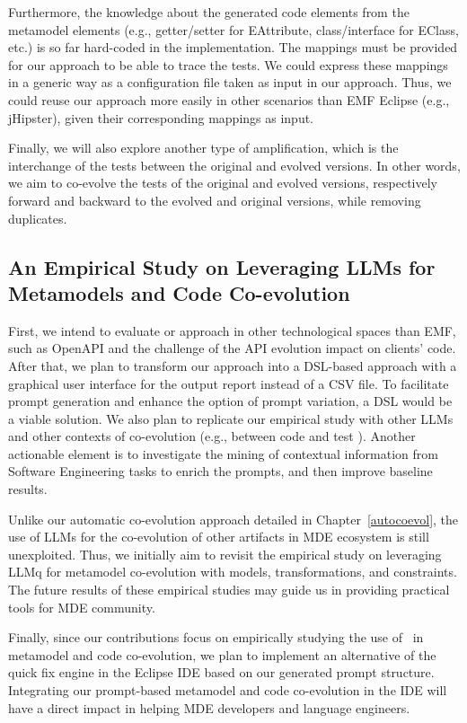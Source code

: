 Furthermore, the knowledge about the generated code elements from the metamodel elements (e.g., getter/setter for EAttribute, class/interface for EClass, etc.) is so far hard-coded in the implementation. The mappings must be provided for our approach to be able to trace the tests. We could express these mappings in a generic way as a configuration file taken as input in our approach. Thus, we could reuse our approach more easily in other scenarios than EMF Eclipse (e.g., jHipster), given their corresponding mappings as input. 

Finally, we will also explore another type of amplification, which is the interchange of the tests between the original and evolved versions. In other words, we aim to co-evolve the tests of the original and evolved versions, respectively forward and backward to the evolved and original versions, while removing duplicates. 

 




\subsection{An Empirical Study on Leveraging LLMs for Metamodels and Code Co-evolution}


First, we intend to evaluate or approach in other technological spaces than EMF, such as OpenAPI and the challenge of the API evolution impact on clients' code. After that, we plan to transform our approach into a DSL-based approach with a graphical user interface for the output report instead of a CSV file. To facilitate prompt generation and enhance the option of prompt variation, a DSL would be a viable solution. We also plan to replicate our empirical study with other LLMs and other contexts of co-evolution (e.g., between code and test \cite{le2021untangling}). Another actionable element is to investigate the mining of contextual information from Software Engineering tasks to enrich the prompts, and then improve baseline results.

Unlike our automatic co-evolution approach detailed in Chapter~\ref{autocoevol}, the use of LLMs for the co-evolution of other artifacts in MDE ecosystem is still unexploited. Thus, we initially aim to revisit the empirical study on leveraging LLMq for metamodel co-evolution with models, transformations, and constraints. The future results of these empirical studies may guide us in providing practical tools for MDE community. 


Finally, since our contributions focus on empirically studying the use of \LLM~in metamodel and code co-evolution, we plan to implement an alternative of the quick fix engine in the Eclipse IDE based on our generated prompt structure. Integrating our prompt-based metamodel and code co-evolution in the IDE will have a direct impact in helping MDE developers and language engineers. 
